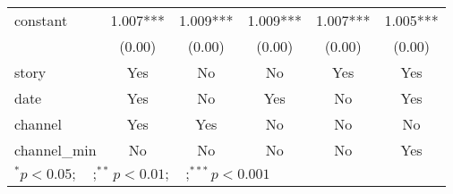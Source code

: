 \begin{tabular}{l*{5}{c}}
constant            &       1.007***&       1.009***&       1.009***&       1.007***&       1.005***\\
                    &      (0.00)   &      (0.00)   &      (0.00)   &      (0.00)   &      (0.00)   \\
\midrule
story               &         Yes   &          No   &          No   &         Yes   &         Yes   \\
date                &         Yes   &          No   &         Yes   &          No   &         Yes   \\
channel             &         Yes   &         Yes   &          No   &          No   &          No   \\
channel\_min         &          No   &          No   &          No   &          No   &         Yes   \\
\bottomrule
\multicolumn{6}{l}{\footnotesize $^{*}p<0.05; \quad ; ^{**} p<0.01; \quad ; ^{***}p<0.001$}\\
\end{tabular}
